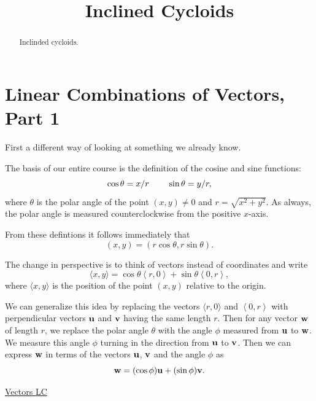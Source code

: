 \documentclass{ximera}
\title{Inclined Cycloids}
\begin{document}
\begin{abstract}
Inclinded cycloids.
\end{abstract}
\maketitle


\section{Linear Combinations of Vectors, Part 1}
First a different way of looking at something we already know.

The basis of our entire course is the definition of the cosine and sine functions:
\[
     \cos\theta = x/r  \hskip 0.3in \sin\theta=y/r ,
\]
where $\theta$ is the polar angle of the point $(x,y)\neq 0$ and $r=\sqrt{x^2+y^2}$. As always, the polar angle is measured counterclockwise from the positive $x$-axis.

From these defintions it follows immediately that
\[
   (x,y) = ( r\cos \theta , r\sin\theta ).
\]

The change in perspective is to think of vectors instead of coordinates and write
\[
    \langle x , y \rangle = \cos\theta \left \langle r,0 \right\rangle + \sin\theta \left\langle 0 ,r\right\rangle ,
\]
where $\langle x,y \rangle$ is the position of the point $(x,y)$ relative to the origin.

We can generalize this idea by replacing the vectors $\langle r, 0\rangle$ and $ \left\langle 0 ,r\right\rangle$ with perpendicular vectors ${\bf u}$ and ${\bf v}$ having the same length $r$. Then for any vector ${\bf w}$ of length $r$, we replace the polar angle $\theta$ with the angle $\phi$ measured from ${\bf u}$ to ${\bf w}$. We measure this angle $\phi$ turning in the direction from ${\bf u}$ to ${\bf v}$. Then we can express ${\bf w}$ in terms of the vectors ${\bf u}$, ${\bf v}$ and the angle $\phi$ as
\[
      {\bf w} = (\cos\phi){\bf u} + (\sin\phi){\bf v}.
\]

\begin{onlineOnly}
    \begin{center}
\end{center}
\end{onlineOnly}

\href{https://www.desmos.com/calculator/dvxeho1urz}{Vectors LC}

\begin{onlineOnly}
    \begin{center}
\end{center}
\end{onlineOnly}
\end{document}
